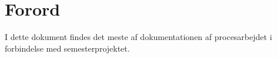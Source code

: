 \chapter*{Forord}
I dette dokument findes det meste af dokumentationen af procesarbejdet i forbindelse med semesterprojektet. 
